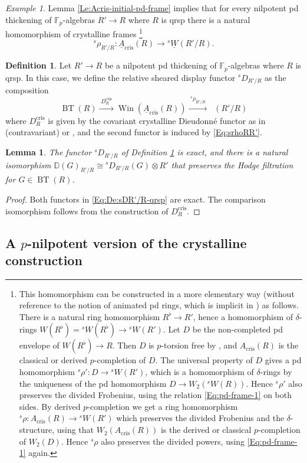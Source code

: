 \documentclass[a4paper,11pt]{amsart}
\theoremstyle{plain}
\newtheorem{Lemma}[equation]{Lemma}
\theoremstyle{definition}
\newtheorem{Defn}[equation]{Definition}
\theoremstyle{remark}
\newtheorem{Example}[equation]{Example}
\newcommand{\bLe}{\begin{Lemma}}
\newcommand{\eLe}{\end{Lemma}}
\newcommand{\bDe}{\begin{Defn}}
\newcommand{\eDe}{\end{Defn}}
\newcommand{\bEx}{\begin{Example}}
\newcommand{\eEx}{\end{Example}}
\newcommand{\bproof}{\begin{proof}}
\newcommand{\eproof}{\end{proof}}
\newcommand{\beqn}{\begin{equation}}
\newcommand{\eeqn}{\end{equation}}
\renewcommand{\u}{\underline}
\numberwithin{equation}{section}
\newcommand{\DD}{{\mathbb{D}}}
\newcommand{\FF}{{\mathbb{F}}}
\DeclareMathOperator{\crys}{cris}
\DeclareMathOperator{\BT}{BT}
\DeclareMathOperator{\sDisp}{{}^sDisp}
\DeclareMathOperator{\Win}{Win}
\newcommand{\sD}{{}^{s\!}D}
\newcommand{\sW}{{}^sW}
\newcommand{\usW}{{}^s\u W}
\newcommand{\srho}{{}^{s\!}\rho}
\begin{document}
\bEx
Lemma \ref{Le:Acris-initial-pd-frame} implies that for every nilpotent pd thickening of $\FF_p$-algebras $R'\to R$ where $R$ is qrsp there is a natural homomorphism of crystalline frames%
\footnote{\label{Fn:srho}This homomorphism can be constructed in a more elementary way (without reference to the notion of animated pd rings, which is implicit in \cite{Magidson:Divided}) as follows. 
There is a natural ring homomorphism $R^\flat\to R'$, hence a homomorphism of $\delta$-rings $W(R^\flat)=\sW(R^\flat)\to\sW(R')$.
Let $D$ be the non-completed pd envelope of $W(R^\flat)\to R$. Then $D$ is $p$-torsion free by \cite[Remark 8.3]{Mathew:Some-recent}, and $A_{\crys}(R)$ is the classical or derived $p$-completion of $D$. The universal property of $D$ gives a pd homomorphism $\srho'\colon D\to\sW(R')$, which is a homomorphism of $\delta$-rings by the uniqueness of the pd homomorphism $D\to W_2(\sW(R))$. Hence $\srho'$ also preserves the divided Frobenius, using the relation \eqref{Eq:pd-frame-1} on both sides. By derived $p$-completion we get a ring homomorphism $\srho\colon A_{\crys}(R)\to\sW(R')$ which preserves the divided Frobenius and the $\delta$-structure, using that $W_2(A_{\crys}(R))$ is the derived or classical $p$-completion of $W_2(D)$. Hence $\srho$ also preserves the divided powers, using  \eqref{Eq:pd-frame-1} again.}
\beqn
\label{Eq:srhoRR'}
\srho_{R'/R}\colon\u A_{\crys}(R)\to\usW(R'/R).
\eeqn
\eEx

\bDe
\label{De:sDR'/R-qrsp}
Let $R'\to R$ be a nilpotent pd thickening of $\FF_p$-algebras where $R$ is qrsp. In this case, we define the relative sheared display functor $\sD_{R'/R}$ as the composition
\beqn
\label{Eq:De:sDR'/R-qrsp}
\BT(R)\xrightarrow{\;D^{\crys}_R\;}\Win(\u A_{\crys}(R))\xrightarrow{\;\srho_{R'/R}\;}\sDisp(R'/R)
\eeqn
where $D^{\crys}_R$ is given by the covariant crystalline Dieudonn\'e functor as in \cite[Lemma A.2]{Kisin:Crystalline} (contravariant) or \cite[Proposition 3.17]{Lau:Relations}, and the second functor is induced by \eqref{Eq:srhoRR'}.
\eDe

\bLe
\label{Le:sDR'/R-qrsp-comp-crys}
The functor $\sD_{R'/R}$ of Definition \ref{De:sDR'/R-qrsp} is exact, and there is a natural isomorphism $\DD(G)_{R'/R}\cong\sD_{R'/R}(G)\otimes R'$ that preserves the Hodge filtration for $G\in\BT(R)$.
\eLe

\bproof
Both functors in \eqref{Eq:De:sDR'/R-qrsp} are exact. The comparison isomorphism follows from the construction of $D^{\crys}_R$.
\eproof

\subsection{A $p$-nilpotent version of the crystalline construction}
\label{Se:Acris-p-nilp}
\end{document}
